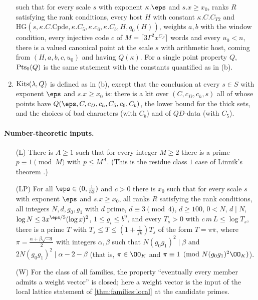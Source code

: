 \begin{definition}
\begin{enumerate}[label=(\alph*)]
such that for every scale $s$ with exponent $\kappa.\eps$ and $s.x\ge x_0$, ranks $R$ satisfying the rank conditions, every
host $H$ with constant $\kappa.C.C_{T2}$ and $\mathrm{HG}(s,\kappa.C.\mathrm{Cpde},\kappa.C_5,\kappa.c_6,\kappa.C_b,H,q_0(H))$,
weights $a,b$ with the window condition, every injective code $c$ of $M=\lceil3\Gamma^2x^{C_F}\rceil$ words and every
$u_0<n$, there is a valued canonical point at the scale $s$ with arithmetic host, coming from $(H,a,b,c,u_0)$ and having
$Q(\kappa)$. For a single point property $Q$, $\stageUPts_0(Q)$ is the same statement with the constants quantified as in
\textup{(b)}.
\item $\mathrm{Kits}(\lambda,Q)$ is defined as in \textup{(b)}, except that the conclusion at every $s\in S$ with exponent
$\eps$ and $s.x\ge x_0$ is: there is a kit over $(C,c_D,c_h,s)$ all of whose points have
$Q(\eps,C,c_D,c_h,C_5,c_6,C_b)$, the lower bound for the thick sets, and the choices of bad characters (with $C_b$) and of
$QD$-data (with $C_5$).
\end{enumerate}
\end{definition}

\paragraph{Number-theoretic inputs.}

\begin{definition}\label{pf:stageU:threestatements}
\begin{itemize}
\item[(L)] There is $A\ge1$ such that for every integer $M\ge2$ there is a prime $p\equiv1\pmod M$ with $p\le M^A$. (This is
the residue class $1$ case of Linnik's theorem \cite{Linnik1944}.)
\item[(LP)] For all $\eps\in(0,\frac1{52})$ and $c>0$ there is $x_0$ such that for every scale $s$ with exponent $\eps$ and
$s.x\ge x_0$, all ranks $R$ satisfying the rank conditions, all integers $N,d,g_0,g_1$ with $d$ prime, $d\equiv3\pmod4$,
$d\ge100$, $0<N$, $d\mid N$, $\log N\le3x^{\eps/5}(\log x)^2$, $1\le g_i\le b^9$, and every $T_s>0$ with
$c\,m\,L\le\log T_s$, there is a prime $T$ with $T_s\le T\le(1+\frac1{fk})T_s$ of the form $T=\pi\bar\pi$, where
$\pi=\frac{\alpha+\beta\sqrt{-d}}2$ with integers $\alpha,\beta$ such that $N(g_0g_1)^2\mid\beta$ and
$2N(g_0g_1)^2\mid\alpha-2-\beta$ (that is, $\pi\in\OO_K$ and $\pi\equiv1\pmod{N(g_0g_1)^2\OO_K}$).
\item[(W)] For the class of all families, the property ``eventually every member admits a weight vector'' is closed;
here a weight vector is the input of the local lattice statement of \cref{thm:families:local} at the candidate primes.
\end{itemize}
\end{definition}

